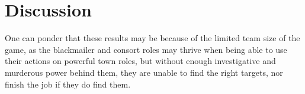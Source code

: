 \section{Discussion}\label{sec:discussion}
One can ponder that these results may be because of the 
limited team size of
the game, as the blackmailer and consort roles may 
thrive when being able to
use
their actions on powerful town roles, but without 
enough investigative and
murderous power behind them, they are unable to find 
the right targets, nor
finish the job if they do find them. 